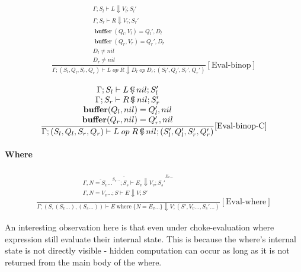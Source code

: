 \documentclass{scrartcl}
\DeclareMathOperator{\where}{where}
\DeclareMathOperator{\ceval}{\overset{C}{\smash{\Downarrow}}}
\DeclareMathOperator{\buffer}{\mathbf{buffer}}
\begin{document}
    \begin{align*}
    \frac{
        \begin{matrix}
        \Gamma; S_l \vdash L \Downarrow V_l; S_l' \\
        \Gamma; S_r \vdash R \Downarrow V_r; S_r' \\
        \buffer(Q_l, V_l) = Q_l', D_l \\
        \buffer(Q_r, V_r) = Q_r', D_r \\
        D_l \neq nil \\
        D_r \neq nil
        \end{matrix}
    }{
        \Gamma; (S_l, Q_l, S_r, Q_r) \vdash L \; op \; R \Downarrow D_l \; op \; D_r; (S_l', Q_l', S_r', Q_r')
    }[\text{Eval-binop}]
    \end{align*}
    
    \begin{align*}
    \frac{
        \begin{matrix}
        \Gamma; S_l \vdash L \ceval nil; S_l' \\
        \Gamma; S_r \vdash R \ceval nil; S_r' \\
        \buffer(Q_l, nil) = Q_l', nil \\
        \buffer(Q_r, nil) = Q_r', nil
        \end{matrix}
    }{
        \Gamma; (S_l, Q_l, S_r, Q_r) \vdash L \; op \; R \ceval nil; (S_l', Q_l', S_r', Q_r')
    }[\text{Eval-binop-C}]
    \end{align*}
    
    \paragraph{Where}
    
    \begin{align*}
    \frac{
        \begin{matrix}
        \overline{\Gamma, \overline{N=S_v...}^{S_v...}; S_s \vdash E_v \Downarrow V_v; S_s'}^{E_v...} \\
        \Gamma, N=V_v...; S \vdash E \Downarrow V; S' \\
        \end{matrix}
    }{
        \Gamma; (S, (S_v...), (S_s...)) \vdash E \where \{ N=E_v... \} \Downarrow V; (S', V_v..., S_s'...)
    }[\text{Eval-where}]
    \end{align*}
    
    An interesting observation here is that even under choke-evaluation where expression still evaluate their internal state. This is because the where's internal state is not directly visible - hidden computation can occur as long as it is not returned from the main body of the where.
    
\end{document}
